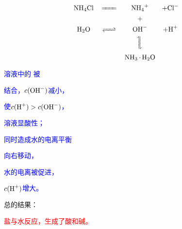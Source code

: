         \begin{minipage}{0.55\textwidth}
            
            \[
            \begin{matrix}
                \cemh{NH4Cl} & \xleq{} & \cemh{NH4^+} & + \cemh{Cl^-} \\
                & & \rotatebox{90}{\cemh{+}} & \\
                \cemh{H2O} & \cemh{<=>} & \cemh{OH^-} & + \cemh{H+} \\
                & & \rotatebox{90}{\cemh{<=>}} & \\
                & & \cemh{NH3 . H2O} &
            \end{matrix}
            \]
            \vspace{-0.5\baselineskip}

            \begin{center}
                
            \end{center}
        \end{minipage}
        \hfil
        \begin{minipage}{0.35\textwidth}
            \textcolor{blue}{溶液中的  被 }
            
            \textcolor{blue}{结合，\(c(\cemh{OH^-})\)减小，}
            
            \textcolor{blue}{使\(c(\cemh{H+})>c(\cemh{OH^-})\)，}
            
            \textcolor{blue}{溶液显酸性；}
            
            \textcolor{blue}{同时造成水的电离平衡}
            
            \textcolor{blue}{向右移动，}
            
            \textcolor{blue}{水的电离被促进，}
            
            \textcolor{blue}{\(c(\cemh{H+})\)增大。}
        \end{minipage}
        \vspace{0.5\baselineskip}

            总的结果：
            \vspace{-\baselineskip}

            \begin{center}
                
                \textcolor{red}{盐与水反应，生成了酸和碱。}
            \end{center}

